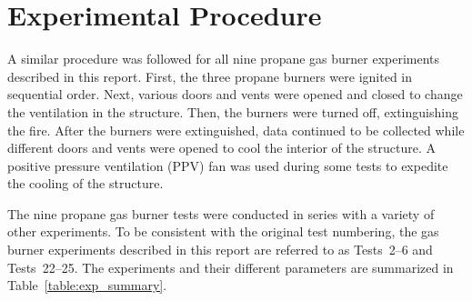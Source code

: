 
\renewcommand{\thechapter}{3}

\chapter{Experimental Procedure}
\label{chap:exp_procedure}

A similar procedure was followed for all nine propane gas burner experiments described in this report. First, the three propane burners were ignited in sequential order. Next, various doors and vents were opened and closed to change the ventilation in the structure. Then, the burners were turned off, extinguishing the fire. After the burners were extinguished, data continued to be collected while different doors and vents were opened to cool the interior of the structure. A positive pressure ventilation (PPV) fan was used during some tests to expedite the cooling of the structure. 

The nine propane gas burner tests were conducted in series with a variety of other experiments. To be consistent with the original test numbering, the gas burner experiments described in this report are referred to as Tests~2--6 and Tests~22--25. The experiments and their different parameters are summarized in Table~\ref{table:exp_summary}.

